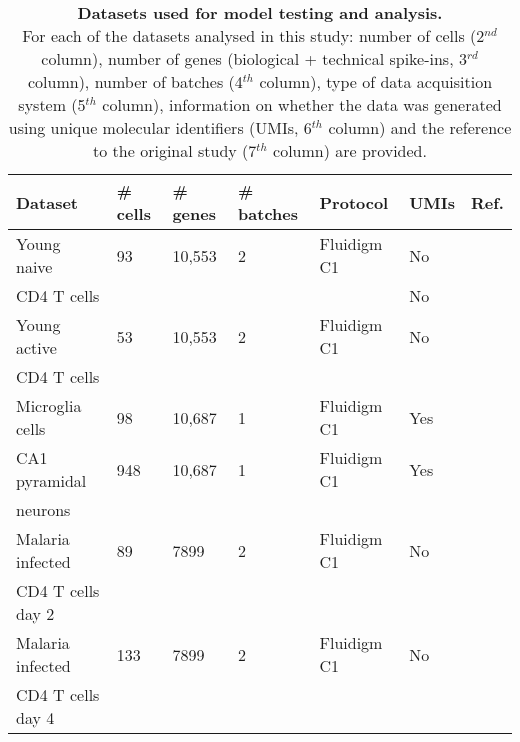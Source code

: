 \begin{table}[ht	]
\centering
\caption[Datasets used for model testing and analysis]{\textbf{Datasets used for model testing and analysis.} \\
For each of the datasets analysed in this study: number of cells (2$^{nd}$ column), number of genes (biological + technical spike-ins, 3$^{rd}$ column), number of batches (4$^{th}$ column), type of data acquisition system (5$^{th}$ column), information on whether the data was generated using unique molecular identifiers (UMIs, 6$^{th}$ column) and the reference to the original study (7$^{th}$ column) are provided.}
\label{tab2:datasets}
\begin{tabular}{lllllll}
\toprule
\textbf{Dataset} & \textbf{\# cells} & \textbf{\# genes} & \textbf{\# batches} & \textbf{Protocol} & \textbf{UMIs} & \textbf{Ref.}                       \\
\midrule
Young naive  & 93       & 10,553    & 2          & Fluidigm C1       & No   & \citep{Martinez-jimenez2017} \\
CD4\plus{} T cells   &        &   &          &       & No   &  \\
\midrule

Young active    & 53       & 10,553    & 2          & Fluidigm C1       & No   & \citep{Martinez-jimenez2017} \\
CD4\plus{} T cells    &        &     &           &        &    &  \\
\midrule

Microglia cells                         & 98       & 10,687    & 1          & Fluidigm C1       & Yes  & \citep{Zeisel2015}           \\
\midrule

CA1 pyramidal                    & 948      & 10,687    & 1          & Fluidigm C1       & Yes  & \citep{Zeisel2015}           \\
neurons       &       &     &           &       &   &           \\
\midrule

Malaria infected     & 89       & 7899     & 2          & Fluidigm C1       & No   & \citep{Lonnberg2017}         \\
CD4\plus{} T cells day 2     &        &      &          &  &    &  \\
\midrule

Malaria infected  & 133      & 7899     & 2          & Fluidigm C1       & No   & \citep{Lonnberg2017}         \\
CD4\plus{} T cells day 4     &       &      &    &  &    &\\
\midrule


\end{tabular}
\end{table}
